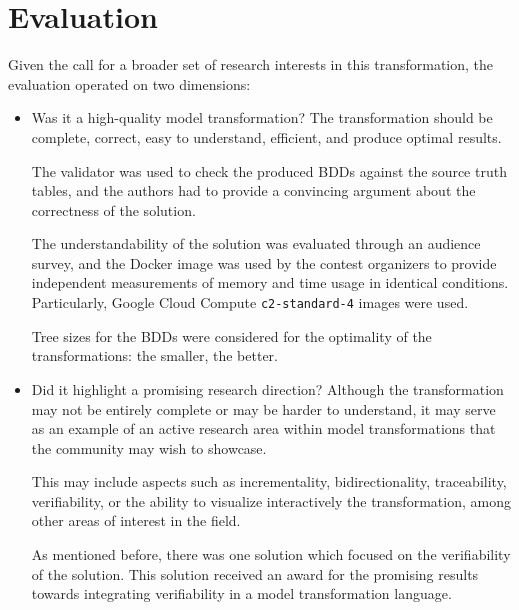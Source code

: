 \documentclass[a4paper]{article}
\newcommand*{\file}[1]{\texttt{#1}}
\begin{document}
\section{Evaluation}
\label{sec:evaluation}

Given the call for a broader set of research interests in this transformation,
the evaluation operated on two dimensions:

\begin{itemize}
\item Was it a high-quality model transformation? The transformation should be
  complete, correct, easy to understand, efficient, and produce optimal results.

  The validator was used to check the produced BDDs against the source truth
  tables, and the authors had to provide a convincing argument about the
  correctness of the solution.

  The understandability of the solution was evaluated through an audience
  survey, and the Docker image was used by the contest organizers to provide
  independent measurements of memory and time usage in identical conditions.
  Particularly, Google Cloud Compute \file{c2-standard-4} images were used.

  Tree sizes for the BDDs were considered for the optimality of the
  transformations: the smaller, the better.

\item Did it highlight a promising research direction? Although the
  transformation may not be entirely complete or may be harder to understand, it
  may serve as an example of an active research area within model
  transformations that the community may wish to showcase.

  This may include aspects such as incrementality, bidirectionality,
  traceability, verifiability, or the ability to visualize interactively the
  transformation, among other areas of interest in the field.

  As mentioned before, there was one solution which focused on the verifiability
  of the solution. This solution received an award for the promising results
  towards integrating verifiability in a model transformation language.
\end{itemize}



\end{document}
